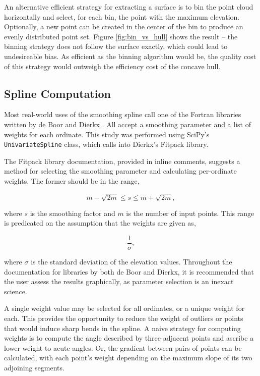 \documentclass[doc]{apa6}
\begin{document}
An alternative efficient strategy for extracting a surface is to bin the point cloud horizontally and select, for each bin, the point with the maximum elevation. Optionally, a new point can be created in the center of the bin to produce an evenly distributed point set. Figure \ref{fig:bin_vs_hull} shows the result -- the binning strategy does not follow the surface exactly, which could lead to undesireable bias. As efficient as the binning algorithm would be, the quality cost of this strategy would outweigh the efficiency cost of the concave hull.


\subsection{Spline Computation}

Most real-world uses of the smoothing spline call one of the Fortran libraries written by de Boor \parencite{deBoor1980} and Dierkx \parencite{Dierckx:1993:CSF:151103}. All accept a smoothing parameter and a list of weights for each ordinate. This study was performed using SciPy's \lstinline{UnivariateSpline}{} class, which calls into Dierkx's Fitpack library. 

The Fitpack library documentation, provided in inline comments, suggests a method for selecting the smoothing parameter and calculating per-ordinate weights. The former should be in the range,

\begin{equation} \label{eq:s_range}
m - \sqrt{2m} \leq s \leq m + \sqrt{2m},
\end{equation}

where $s$ is the smoothing factor and $m$ is the number of input points. This range is predicated on the assumption that the weights are given as,

\begin{equation}
\frac{1}{\sigma},
\end{equation}

where $\sigma$ is the standard deviation of the elevation values. Throughout the documentation for libraries by both de Boor and Dierkx, it is recommended that the user assess the results graphically, as parameter selection is an inexact science. 

A single weight value may be selected for all ordinates, or a unique weight for each. This provides the opportunity to reduce the weight of outliers or points that would induce sharp bends in the spline. A naive strategy for computing weights is to compute the angle described by three adjacent points and ascribe a lower weight to acute angles. Or, the gradient between pairs of points can be calculated, with each point's weight depending on the maximum slope of its two adjoining segments.
\end{document}
